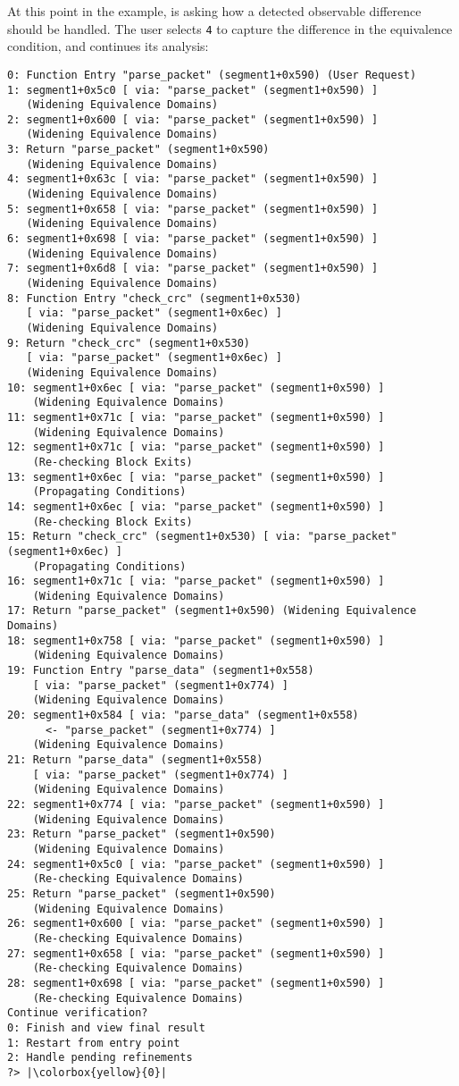 At this point in the example, \pate{} is asking how a detected observable difference should be handled.
The user selects \texttt{4} to capture the difference in the equivalence condition, and \pate{} continues its analysis:

\begin{lstlisting}
0: Function Entry "parse_packet" (segment1+0x590) (User Request)
1: segment1+0x5c0 [ via: "parse_packet" (segment1+0x590) ] 
   (Widening Equivalence Domains)
2: segment1+0x600 [ via: "parse_packet" (segment1+0x590) ] 
   (Widening Equivalence Domains)
3: Return "parse_packet" (segment1+0x590) 
   (Widening Equivalence Domains)
4: segment1+0x63c [ via: "parse_packet" (segment1+0x590) ] 
   (Widening Equivalence Domains)
5: segment1+0x658 [ via: "parse_packet" (segment1+0x590) ] 
   (Widening Equivalence Domains)
6: segment1+0x698 [ via: "parse_packet" (segment1+0x590) ] 
   (Widening Equivalence Domains)
7: segment1+0x6d8 [ via: "parse_packet" (segment1+0x590) ] 
   (Widening Equivalence Domains)
8: Function Entry "check_crc" (segment1+0x530) 
   [ via: "parse_packet" (segment1+0x6ec) ] 
   (Widening Equivalence Domains)
9: Return "check_crc" (segment1+0x530) 
   [ via: "parse_packet" (segment1+0x6ec) ] 
   (Widening Equivalence Domains)
10: segment1+0x6ec [ via: "parse_packet" (segment1+0x590) ] 
    (Widening Equivalence Domains)
11: segment1+0x71c [ via: "parse_packet" (segment1+0x590) ] 
    (Widening Equivalence Domains)
12: segment1+0x71c [ via: "parse_packet" (segment1+0x590) ] 
    (Re-checking Block Exits)
13: segment1+0x6ec [ via: "parse_packet" (segment1+0x590) ] 
    (Propagating Conditions)
14: segment1+0x6ec [ via: "parse_packet" (segment1+0x590) ] 
    (Re-checking Block Exits)
15: Return "check_crc" (segment1+0x530) [ via: "parse_packet" (segment1+0x6ec) ] 
    (Propagating Conditions)
16: segment1+0x71c [ via: "parse_packet" (segment1+0x590) ] 
    (Widening Equivalence Domains)
17: Return "parse_packet" (segment1+0x590) (Widening Equivalence Domains)
18: segment1+0x758 [ via: "parse_packet" (segment1+0x590) ] 
    (Widening Equivalence Domains)
19: Function Entry "parse_data" (segment1+0x558) 
    [ via: "parse_packet" (segment1+0x774) ] 
    (Widening Equivalence Domains)
20: segment1+0x584 [ via: "parse_data" (segment1+0x558) 
      <- "parse_packet" (segment1+0x774) ] 
    (Widening Equivalence Domains)
21: Return "parse_data" (segment1+0x558) 
    [ via: "parse_packet" (segment1+0x774) ] 
    (Widening Equivalence Domains)
22: segment1+0x774 [ via: "parse_packet" (segment1+0x590) ] 
    (Widening Equivalence Domains)
23: Return "parse_packet" (segment1+0x590) 
    (Widening Equivalence Domains)
24: segment1+0x5c0 [ via: "parse_packet" (segment1+0x590) ] 
    (Re-checking Equivalence Domains)
25: Return "parse_packet" (segment1+0x590) 
    (Widening Equivalence Domains)
26: segment1+0x600 [ via: "parse_packet" (segment1+0x590) ] 
    (Re-checking Equivalence Domains)
27: segment1+0x658 [ via: "parse_packet" (segment1+0x590) ] 
    (Re-checking Equivalence Domains)
28: segment1+0x698 [ via: "parse_packet" (segment1+0x590) ] 
    (Re-checking Equivalence Domains)
Continue verification?
0: Finish and view final result 
1: Restart from entry point 
2: Handle pending refinements 
?> |\colorbox{yellow}{0}|
\end{lstlisting}

